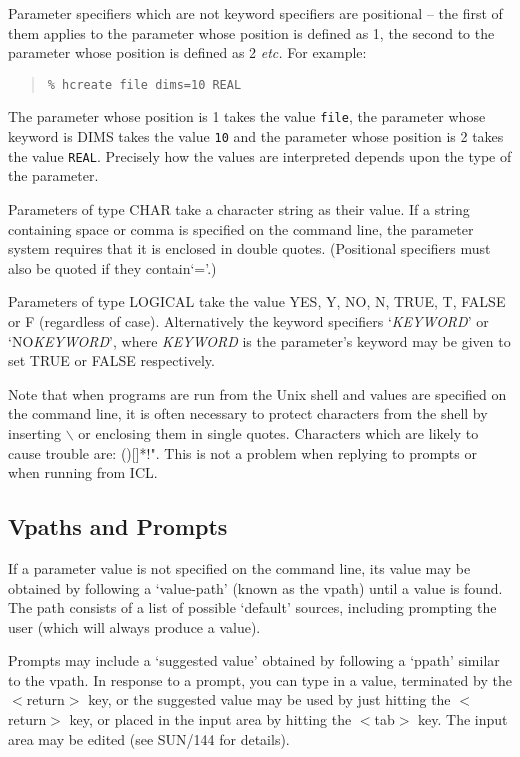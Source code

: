 \documentclass[twoside,11pt]{article}
\newcommand{\xref}[3]{#1}
\renewcommand{\_}{\texttt{\symbol{95}}}
\begin{document}
Parameter specifiers which are not keyword specifiers are positional -- the
first of them applies to the parameter whose position is defined as 1, 
the second to the parameter whose position is defined as 2 \textit{etc.}
For example:
\begin{quote}
\texttt{\% hcreate file dims=10 \_REAL}
\end{quote}
The parameter whose position is 1 takes the value \texttt{file}, the parameter
whose keyword is DIMS takes the value \texttt{10} and the parameter whose
position is 2 takes the value \texttt{\_REAL}. Precisely how the values are
interpreted depends upon the type of the parameter.

Parameters of type \_CHAR take a character string as their value. If a string
containing space or comma is specified on the command line, the parameter
system requires that it is enclosed in double quotes. (Positional specifiers
must also be quoted if they contain`='.)

Parameters of type \_LOGICAL take the value YES, Y, NO, N, TRUE, T, FALSE or F
(regardless of case). Alternatively the keyword specifiers `\textit{KEYWORD}'
or `NO\textit{KEYWORD}', where \textit{KEYWORD} is the parameter's keyword
may be given to set TRUE or FALSE respectively.

Note that when programs are run from the Unix shell and values are specified
on the command line, it is often necessary to protect characters from the
shell by inserting $\backslash$ or enclosing them in single quotes.
Characters which are likely to cause trouble are: ()[]*!".
This is not a problem when replying to prompts or when running from ICL.

\subsection{Vpaths and Prompts}
If a parameter value is not specified on the command line, its value may be
obtained by following a `value-path' (known as the vpath) until a value is
found. The path consists of a list of possible `default' sources, including
prompting the user (which will always produce a value). 

Prompts may include a `suggested value' obtained by
following a `ppath' similar to the vpath. 
In response to a prompt, you can type in a value, terminated by the
$<$return$>$ key, or the suggested value may be used by just
hitting the $<$return$>$ key, or placed in the input area by hitting the
$<$tab$>$
key. The input area may be edited (see 
\xref{SUN/144}{sun144}{input_line_editing}
for details).
\end{document}
